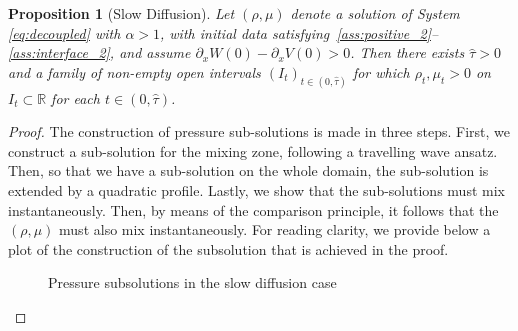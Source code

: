 \documentclass[a4paper,twosided, 11pt]{article}
\newcommand{\eps}{\varepsilon}
\newcommand{\R}{\mathbb{R}}
\theoremstyle{plain}
\newtheorem{proposition}[thm]{Proposition}
\theoremstyle{remark}
\numberwithin{equation}{section}
\begin{document}
\begin{proposition}[Slow Diffusion]\label{propn:slow}
    Let $(\rho,\mu)$ denote a solution of System \eqref{eq:decoupled} with $\alpha > 1$, with initial data satisfying~\ref{ass:positive_2}--\ref{ass:interface_2}, and assume $\partial_x W(0)-\partial_xV(0)>0$.
    Then there exists $\hat{\tau} > 0$ and a family of non-empty open intervals $(I_t)_{t\in (0,\hat{\tau})}$ for which $\rho_t,\mu_t > 0$ on $I_t\subset \R$ for each ${t\in (0,\hat{\tau})} $.
\end{proposition}
\begin{proof}
The construction of pressure sub-solutions is made in three steps. 
First, we construct a sub-solution for the mixing zone, following a travelling wave ansatz. 
Then, so that we have a sub-solution on the whole domain, the sub-solution is extended by a quadratic profile. 
Lastly, we show that the sub-solutions must mix instantaneously. Then, by means of the comparison principle, it follows that the $(\rho,\mu)$ must also mix instantaneously. For reading clarity, we provide below a plot of the construction of the subsolution that is achieved in the proof.

\begin{figure}[H]
\centering
{}
\caption{Pressure subsolutions in the slow diffusion case}
\end{figure}


\end{proof}
\end{document}
